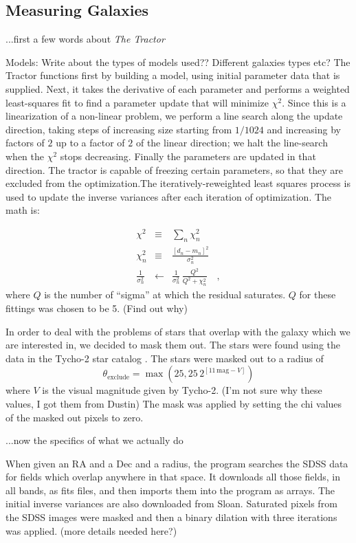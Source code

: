 \documentclass[12pt,preprint,pdftex]{aastex}
\newcommand{\project}[1]{\textsl{#1}}
\newcommand{\units}[1]{\mathrm{#1}}
\renewcommand{\mag}{\units{mag}}
\begin{document}
\subsection{Measuring Galaxies}

...first a few words about \project{The Tractor}

Models: Write about the types of models used?? Different galaxies
types etc?  The Tractor functions first by building a model, using
initial parameter data that is supplied. Next, it takes the derivative
of each parameter and performs a weighted least-squares fit to find a
parameter update that will minimize $\chi^2$.  Since this is a
linearization of a non-linear problem, we perform a line search along
the update direction, taking steps of increasing size starting from
$1/1024$ and increasing by factors of $2$ up to a factor of $2$ of the
linear direction; we halt the line-search when the $\chi^2$ stops
decreasing.  Finally the parameters are updated in that direction. The
tractor is capable of freezing certain parameters, so that they are
excluded from the optimization.The iteratively-reweighted least
squares process is used to update the inverse variances after each
iteration of optimization. The math is:

\begin{eqnarray}
\chi^2 &\equiv& \sum_n \chi_n^2
\\
\chi_n^2 &\equiv& \frac{[d_n - m_n]^2}{\sigma_n^2}
\\
\frac{1}{\sigma_n^2} &\leftarrow& \frac{1}{\sigma_n^2}\,\frac{Q^2}{Q^2+\chi_n^2}
\quad ,
\end{eqnarray}
where $Q$ is the number of ``sigma'' at which the residual saturates. $Q$ for these fittings was chosen to be 5. (Find out why)

In order to deal with the problems of stars that overlap with the
galaxy which we are interested in, we decided to mask them out. The
stars were found using the data in the Tycho-2 star catalog \citep{tycho2}.
The stars were masked out to a
radius of
\begin{equation}
\theta_{\mathrm{exclude}} = \max(25, 25\,2^{[11\,\mag-V]})
\end{equation}
where $V$ is the visual magnitude given by Tycho-2.
(I'm not sure why these values, I got them from Dustin) The mask was applied by setting the chi values of the masked out pixels to zero.

...now the specifics of what we actually do

When given an RA and a Dec and a radius, the program searches the SDSS
data for fields which overlap anywhere in that space. It downloads all
those fields, in all bands, as fits files, and then imports them into
the program as arrays. The initial inverse variances are also
downloaded from Sloan.  Saturated pixels from the SDSS images were
masked and then a binary dilation with three iterations was
applied. (more details needed here?)
\end{document}
